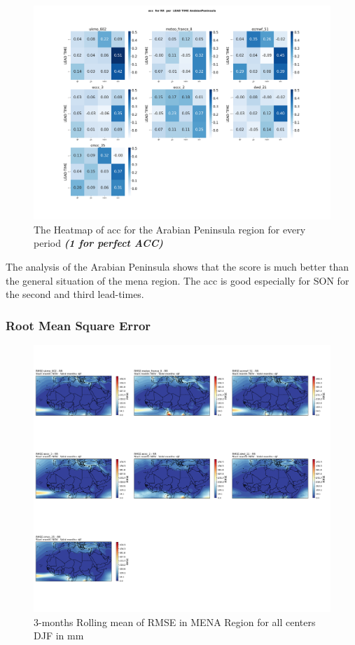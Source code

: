 \begin{figure}[H]
	\centering
	\includegraphics[scale=0.25]{plots/det/acc/acc_RR_ArabianPeninsula.png}
	\caption{The Heatmap of acc for the Arabian Peninsula region for every period  \textbf{\textit{(1 for perfect ACC)} }}
\end{figure}

The analysis of the Arabian Peninsula shows that the score is much better than the general situation of the mena region. The acc is good especially for SON for the second and third lead-times.

\subsubsection{Root Mean Square Error}
 


\begin{figure}[H]
\centering
\includegraphics[scale=0.3]{plots/det/rmse/rmse_djf_RR.png}
\caption{3-months Rolling mean of RMSE in MENA Region for all centers DJF in mm}
\end{figure}

